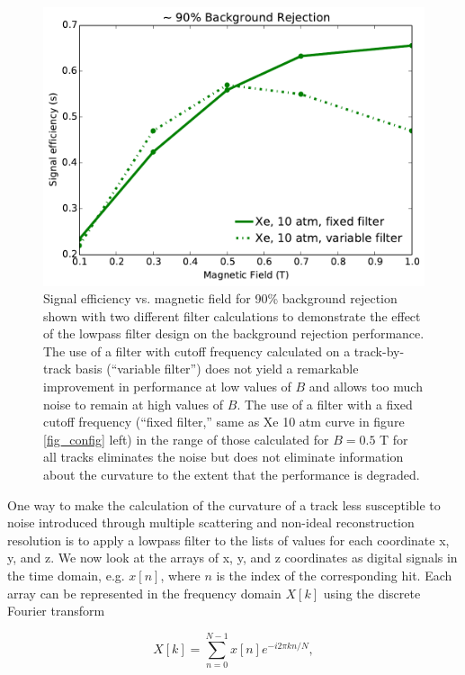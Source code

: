 \documentclass{JINST}
\begin{document}
\begin{figure}[!htb]
	\centering
	\includegraphics[scale=0.6]{fig/eff_vs_b_cf_filter_90.pdf}
	\caption{\label{fig_FIRdependence}Signal efficiency vs. magnetic field for 90\% background rejection shown with two different filter calculations to demonstrate the effect of the lowpass filter design on the background rejection performance.  The use of a filter with cutoff frequency calculated on a track-by-track basis (``variable filter'') does not yield a remarkable improvement in performance at low values of $B$ and allows too much noise to remain at high values of $B$.  The use of a filter with a fixed cutoff frequency (``fixed filter,'' same as Xe 10 atm curve in figure \protect\ref{fig_config} left) in the range of those calculated for $B = 0.5$ T for all tracks eliminates the noise but does not eliminate information about the curvature to the extent that the performance is degraded.}
\end{figure}


One way to make the calculation of the curvature of a track less susceptible to noise 
introduced through multiple scattering and non-ideal reconstruction resolution is to apply a lowpass filter to 
the lists of values for each coordinate x, y, and z.  We now look at the arrays of x, y, and z coordinates as digital 
signals in the time domain, e.g. $x[n]$, where $n$ is the index of the corresponding hit.  Each array can be 
represented in the frequency domain $X[k]$ using the discrete Fourier transform

\begin{equation}
X[k] = \sum_{n=0}^{N-1}x[n]e^{-i2\pi kn/N},
\end{equation}
\end{document}
